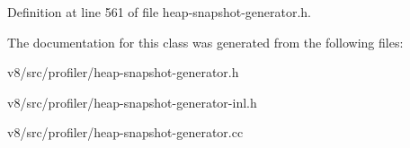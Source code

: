 Definition at line 561 of file heap-\/snapshot-\/generator.\+h.



The documentation for this class was generated from the following files\+:\begin{DoxyCompactItemize}
\item 
v8/src/profiler/heap-\/snapshot-\/generator.\+h\item 
v8/src/profiler/heap-\/snapshot-\/generator-\/inl.\+h\item 
v8/src/profiler/heap-\/snapshot-\/generator.\+cc\end{DoxyCompactItemize}
